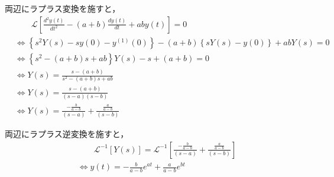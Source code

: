 \documentclass[a4paper,12pt]{article}
\begin{document}
\begin{tcolorbox}[title={[14] つぎの微分方程式をラプラス変換を用いて解け．\\
\[
\frac{d^2y(t)}{dt^2} -( a + b )\frac{dy(t)}{dt} + a b y(t) = 0
\]

\quad ただし，初期条件は，\(y(0)=1, y^{(1)}(0)=0\) とする．}]

\quad 両辺にラプラス変換を施すと，
        \vspace{-3mm}
        \begin{align*}
            &\qquad \mathcal{L}\left[ \frac{d^2y(t)}{dt^2} - ( a + b )\frac{dy(t)}{dt} + a b y(t) \right] = 0 \\
            &\Leftrightarrow \left\{ s^2 Y(s) - sy(0) - y^{(1)}(0) \right\}
            - (a+b)\left\{ sY(s) - y(0) \right\}
            + abY(s) = 0  \\
            &\Leftrightarrow \left\{ s^2 - (a + b) s + ab\right\} Y(s) - s + ( a + b )= 0  \\
            &\Leftrightarrow Y(s) = \frac{s - (a + b)}{ s^2 - (a + b) s + ab }  \\
            &\Leftrightarrow Y(s) =  \frac{s - (a + b)}{ (s - a)(s - b) }  \\
            &\Leftrightarrow Y(s) =  \frac{- \frac{b}{a-b}}{ (s - a) } + \frac{ \frac{a}{a-b}}{ (s - b) }
        \end{align*}
            
        \quad 両辺にラプラス逆変換を施すと，
        \vspace{-3mm}
        \begin{align*}
        &\qquad \mathcal{L}^{-1} \left[ Y(s) \right] 
        = \mathcal{L}^{-1} \left[ \frac{- \frac{b}{a-b}}{ (s - a) } + \frac{ \frac{a}{a-b}}{ (s - b) }  \right] \\
        &\Leftrightarrow y(t) = - \frac{b}{a-b}e^{at} + \frac{a}{a-b}e^{bt}
        \end{align*}
    \end{tcolorbox}
\end{document}
